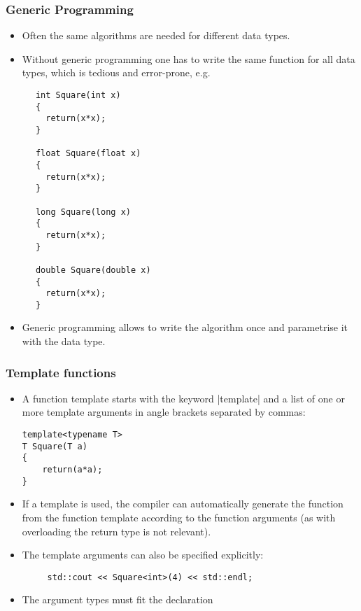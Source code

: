 
\begin{frame}[fragile]
\frametitle<presentation>{Generic Programming}


\begin{itemize}%
\item Often the same algorithms are needed for different data types.
\item Without generic programming one has to write the same function for all data types, which is tedious and error-prone, e.g.
\end{itemize}
\begin{multicols}{2}
    \begin{lstlisting}
      int Square(int x)
      {
        return(x*x);
      }

      float Square(float x)
      {
        return(x*x);
      }

      long Square(long x)
      {
        return(x*x);
      }

      double Square(double x)
      {
        return(x*x);
      }
    \end{lstlisting}
\end{multicols}
\vskip-7mm
\begin{itemize}
\item Generic programming allows to write the algorithm once and parametrise it with the
data type.
\end{itemize}

\end{frame}


\begin{frame}[fragile]
\frametitle{Template functions}
\begin{itemize}%
\item A function template starts with the keyword \inline|template| and a list of one or more template arguments
in angle brackets separated by commas:
\begin{lstlisting}
template<typename T>
T Square(T a)
{
    return(a*a);
}
\end{lstlisting}
\item If a template is used, the compiler can automatically generate the function from the function template according to the function arguments (as with overloading the return type is not relevant).
 \item The template arguments can also be specified explicitly:
 \begin{lstlisting}
     std::cout << Square<int>(4) << std::endl;
 \end{lstlisting}
 \item The argument types must fit the declaration
\end{itemize}
\end{frame}

